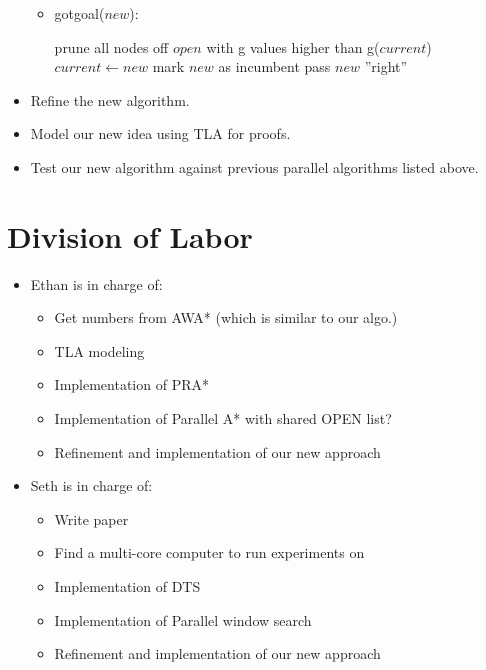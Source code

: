 \documentclass{article}
\begin{document}
\begin{itemize}
\begin{itemize}
  \item gotgoal($new$):
  \begin{algorithmic}[1]
        \STATE prune all nodes off $open$ with g values higher than g($current$)
        \STATE $current \leftarrow new$
          \STATE mark $new$ as incumbent
          \ENDIF
        \STATE pass $new$ ''right''
      \ENDIF
  \end{algorithmic}
  \end{itemize}

\item Refine the new algorithm.

\item Model our new idea using TLA for proofs.

\item Test our new algorithm against previous parallel algorithms
  listed above.

\end{itemize}

\section{Division of Labor}

\begin{itemize}
\item Ethan is in charge of:
  \begin{itemize}
  \item Get numbers from AWA* (which is similar to our algo.)
  \item TLA modeling
  \item Implementation of PRA*
  \item Implementation of Parallel A* with shared OPEN list?
  \item Refinement and implementation of our new approach
  \end{itemize}
\item Seth is in charge of:
  \begin{itemize}
  \item Write paper
  \item Find a multi-core computer to run experiments on
  \item Implementation of DTS
  \item Implementation of Parallel window search
  \item Refinement and implementation of our new approach
  \end{itemize}
\end{itemize}
\end{document}
